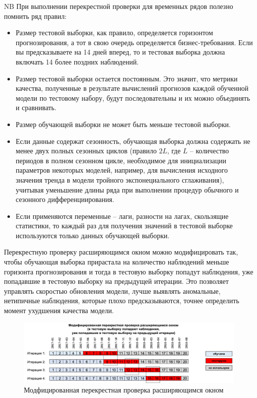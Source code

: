 \documentclass[%
	11pt,
	a4paper,
	utf8,
		]{article}
\begin{document}
NB При выполнении перекрестной проверки для временных рядов полезно помнить ряд правил:
\begin{itemize}
	\item Размер тестовой выборки, как правило, определяется горизонтом прогнозирования, а тот в свою очередь определяется бизнес-требования. Если вы предсказываете на 14 дней вперед, то и тестовая выборка должна включать 14 более поздних наблюдений.
	
	\item Размер тестовой выборки остается постоянным. Это значит, что метрики качества, полученные в результате вычислений прогнозов каждой обученной модели по тестовому набору, будут последовательны и их можно объединять и сравнивать.
	
	\item Размер обучающей выборки не может быть меньше тестовой выборки.
	
	\item Если данные содержат сезонность, обучающая выборка должна содержать не менее двух полных сезонных циклов (правило $ 2L $, где $ L $ -- количество периодов в полном сезонном цикле, необходимое для инициализации параметров некоторых моделей, например, для вычисления исходного значения тренда в модели тройного экспонециального сглаживания), учитывая уменьшение длины ряда при выполнении процедур обычного и сезонного дифференциирования.
	
	\item Если применяются переменные -- лаги, разности на лагах, скользящие статистики, то каждый раз для получения значений в тестовой выборке используются только данных обучающей выборки.
\end{itemize}

Перекрестную проверку расширяющимся окном можно модифицировать так, чтобы обучающая выборка прирастала на количество наблюдений меньше горизонта прогнозирования и тогда в тестовую выборку попадут наблюдения, уже попадавшие в тестовую выборку на предыдущей итерации. Это позволяет управлять скоростью обновления модели, лучше выявлять аномальные, нетипичные наблюдения, которые плохо предсказываются, точнее определить момент ухудшения качества модели.

\begin{figure}[h]
	\centering
	\includegraphics[scale=0.3]{figures/cross_val_expand_ts.png}
	\caption{ Модфицированная перекрестная проверка расширяющимся окном }\label{fig:cross_val_expand_ts}
\end{figure}
\end{document}
